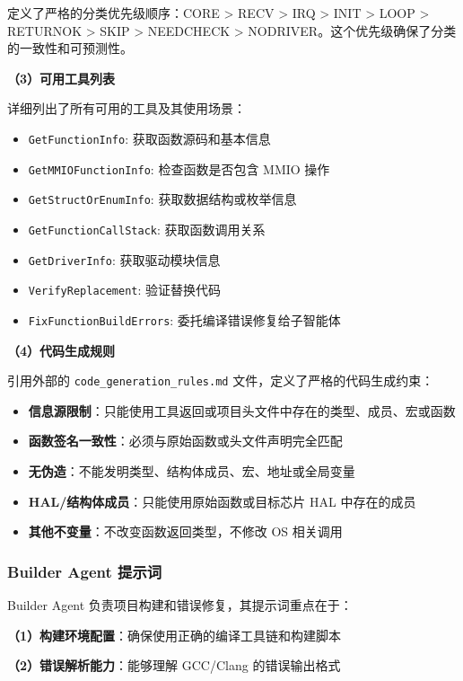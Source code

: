 定义了严格的分类优先级顺序：CORE > RECV > IRQ > INIT > LOOP > RETURNOK > SKIP > NEEDCHECK > NODRIVER。这个优先级确保了分类的一致性和可预测性。

\textbf{（3）可用工具列表}

详细列出了所有可用的工具及其使用场景：
\begin{itemize}
    \item \texttt{GetFunctionInfo}: 获取函数源码和基本信息
    \item \texttt{GetMMIOFunctionInfo}: 检查函数是否包含 MMIO 操作
    \item \texttt{GetStructOrEnumInfo}: 获取数据结构或枚举信息
    \item \texttt{GetFunctionCallStack}: 获取函数调用关系
    \item \texttt{GetDriverInfo}: 获取驱动模块信息
    \item \texttt{VerifyReplacement}: 验证替换代码
    \item \texttt{FixFunctionBuildErrors}: 委托编译错误修复给子智能体
\end{itemize}

\textbf{（4）代码生成规则}

引用外部的 \texttt{code\_generation\_rules.md} 文件，定义了严格的代码生成约束：

\begin{itemize}
    \item \textbf{信息源限制}：只能使用工具返回或项目头文件中存在的类型、成员、宏或函数
    \item \textbf{函数签名一致性}：必须与原始函数或头文件声明完全匹配
    \item \textbf{无伪造}：不能发明类型、结构体成员、宏、地址或全局变量
    \item \textbf{HAL/结构体成员}：只能使用原始函数或目标芯片 HAL 中存在的成员
    \item \textbf{其他不变量}：不改变函数返回类型，不修改 OS 相关调用
\end{itemize}

\subsubsection{Builder Agent 提示词}

Builder Agent 负责项目构建和错误修复，其提示词重点在于：

\textbf{（1）构建环境配置}：确保使用正确的编译工具链和构建脚本

\textbf{（2）错误解析能力}：能够理解 GCC/Clang 的错误输出格式

